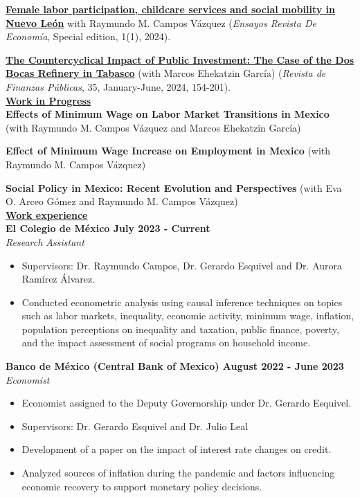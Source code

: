 \documentclass{article}
\begin{document}
\noindent 
\href{https://doi.org/10.29105/ensayos_esp1.1-1}{\textbf{Female labor participation, childcare services and social mobility in Nuevo León}} with Raymundo M. Campos Vázquez (\textit{Ensayos Revista De Economía}, Special edition, 1(1), 2024). 


\noindent \href{https://cefp.gob.mx/cefpnew/revista.php}{\textbf{The Countercyclical Impact of Public Investment: The Case of the Dos Bocas Refinery in Tabasco}} (with Marcos Ehekatzin García) (\textit{Revista de Finanzas Públicas}, 35, January-June, 2024,  154-201). \\




\noindent \textbf{\underline{Work in Progress}} \\
\noindent \textbf{Effects of Minimum Wage on Labor Market Transitions in Mexico} (with Raymundo M. Campos Vázquez and Marcos Ehekatzin García) 


\noindent \textbf{Effect of Minimum Wage Increase on Employment in Mexico} (with Raymundo M. Campos Vázquez) 


\noindent \textbf{Social Policy in Mexico: Recent Evolution and Perspectives} (with Eva O. Arceo Gómez and Raymundo M. Campos Vázquez) \\

\noindent \textbf{\underline{Work experience}} \\
\noindent \textbf{El Colegio de México \hfill  July 2023 - Current } \\
\textit{Research Assistant}  \begin{itemize}[noitemsep,nolistsep,leftmargin=*]
\item {Supervisors: Dr. Raymundo Campos, Dr.  Gerardo Esquivel and Dr. Aurora Ramírez Álvarez.}
\item {Conducted econometric analysis using causal inference techniques on topics such as labor markets, inequality, economic activity, minimum wage, inflation, population perceptions on inequality and taxation, public finance, poverty, and the impact assessment of social programs on household income.} 
\end{itemize}

\noindent \textbf{Banco de México (Central Bank of Mexico) \hfill August 2022 - June 2023}  \\
\textit{Economist} 
\begin{itemize}[noitemsep,nolistsep,leftmargin=*]
\item {Economist assigned to the Deputy Governorship under Dr. Gerardo Esquivel.}
\item {Supervisors: Dr. Gerardo Esquivel and Dr. Julio Leal}
\item {Development of a paper on the impact of interest rate changes on credit.} 
\item {Analyzed sources of inflation during the pandemic and factors influencing economic recovery to support monetary policy decisions.} 
\end{itemize}
\end{document}
